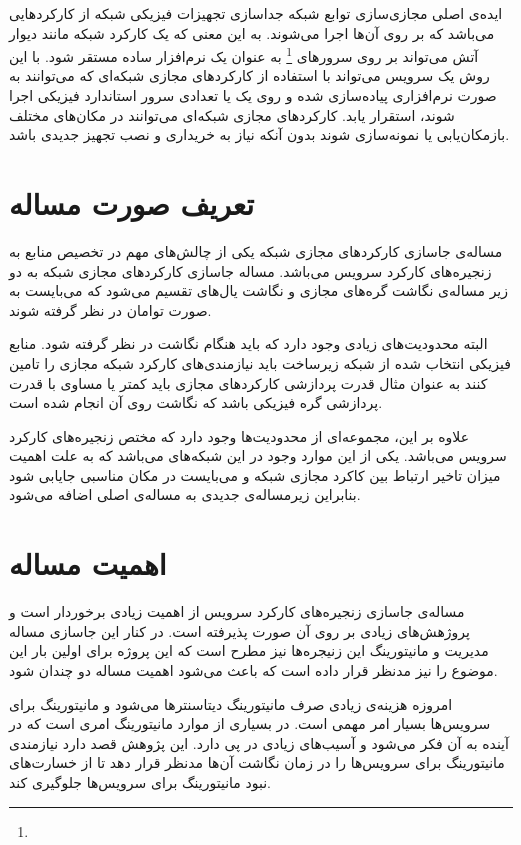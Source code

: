 ایده‌ی اصلی مجازی‌سازی توابع شبکه جداسازی تجهیزات فیزیکی شبکه از کارکردهایی می‌باشد که
بر روی آن‌ها اجرا می‌شوند.
به این معنی که یک کارکرد شبکه مانند دیوار آتش می‌تواند بر روی سرورهای
\footnote{}
به عنوان یک نرم‌افزار ساده مستقر شود.
با این روش یک سرویس می‌تواند با استفاده از کارکردهای مجازی شبکه‌ای که می‌توانند به صورت نرم‌افزاری پیاده‌سازی شده
و روی یک یا تعدادی سرور استاندارد فیزیکی اجرا شوند، استقرار یابد.
کارکردهای مجازی شبکه‌ای می‌توانند در مکان‌های مختلف بازمکان‌یابی یا نمونه‌سازی شوند بدون آنکه
نیاز به خریداری و نصب تجهیز جدیدی باشد.
\cite{Mijumbi2016}

\section{تعریف صورت مساله}
مساله‌ی جاسازی کارکردهای مجازی شبکه یکی از چالش‌های مهم در تخصیص منابع به زنجیره‌های کارکرد سرویس می‌باشد.
مساله جاسازی کارکردهای مجازی شبکه به دو زیر مساله‌ی نگاشت گره‌های مجازی و نگاشت یال‌های تقسیم می‌شود که می‌بایست
به صورت توامان در نظر گرفته شوند.

البته محدودیت‌های زیادی وجود دارد که باید هنگام نگاشت در نظر گرفته شود. منابع فیزیکی انتخاب شده
از شبکه زیرساخت باید نیازمندی‌های کارکرد شبکه مجازی را تامین کنند به عنوان مثال
قدرت پردازشی کارکرد‌های مجازی باید کمتر یا مساوی با قدرت پردازشی گره فیزیکی باشد که نگاشت
روی آن انجام شده است.

علاوه بر این، مجموعه‌ای از محدودیت‌ها وجود دارد که مختص زنجیره‌های کارکرد سرویس می‌باشد.
یکی از این موارد وجود
در این شبکه‌های می‌باشد که به علت اهمیت میزان تاخیر ارتباط بین کاکرد مجازی شبکه و
می‌بایست در مکان مناسبی جایابی شود بنابراین زیرمساله‌ی جدیدی به مساله‌ی اصلی اضافه می‌شود.

\section{اهمیت مساله}
مساله‌ی جاسازی زنجیره‌های کارکرد سرویس از اهمیت زیادی برخوردار است و پروژهش‌های زیادی
بر روی آن صورت پذیرفته است.
در کنار این جاسازی مساله مدیریت و مانیتورینگ این زنیجره‌ها نیز مطرح است
که این پروژه برای اولین بار این موضوع را نیز مدنظر قرار داده است که باعث می‌شود اهمیت
مساله دو چندان شود.

امروزه هزینه‌ی زیادی صرف مانیتورینگ دیتاسنترها می‌شود و مانیتورینگ برای سرویس‌ها بسیار امر مهمی است.
در بسیاری از موارد مانیتورینگ امری است که در آینده به آن فکر می‌شود و
آسیب‌های زیادی در پی دارد.
این پژوهش قصد دارد نیازمندی مانیتورینگ برای سرویس‌ها را در زمان نگاشت آن‌ها مدنظر قرار دهد تا
از خسارت‌های نبود مانیتورینگ برای سرویس‌ها جلوگیری کند.

